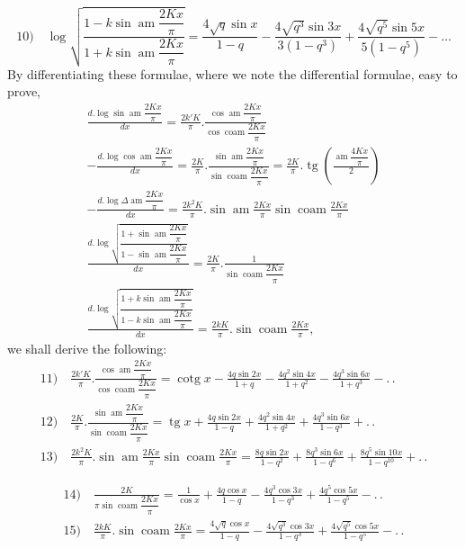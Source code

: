 \documentclass{article}
\begin{document}
\[
\text{10)}\quad\log\sqrt{\frac{1-k\sin\operatorname{am}\dfrac{2Kx}{\pi}}{1+k\sin\operatorname{am}\dfrac{2Kx}{\pi}}}=\frac{4\sqrt{q}\sin x}{1-q}-\frac{4\sqrt{q^{3}}\sin3x}{3(1-q^{3})}+\frac{4\sqrt{q^{5}}\sin5x}{5(1-q^{5})}-\ldots
\]
By differentiating these formulae, where we note the differential formulae, easy to prove,
\[
\begin{gathered}
\frac{d.\log\sin\operatorname{am}\dfrac{2Kx}{\pi}}{dx}=\frac{2k'K}{\pi}.\frac{\cos\operatorname{am}\dfrac{2Kx}{\pi}}{\cos\operatorname{coam}\dfrac{2Kx}{\pi}}\\[2ex]
-\frac{d.\log\cos\operatorname{am}\dfrac{2Kx}{\pi}}{dx}=\frac{2K}{\pi}.\frac{\sin\operatorname{am}\dfrac{2Kx}{\pi}}{\sin\operatorname{coam}\dfrac{2Kx}{\pi}}=\frac{2K}{\pi}.\operatorname{tg}\left(\frac{\operatorname{am}\dfrac{4Kx}{\pi}}{2}\right)\\[2ex]
-\frac{d.\log\Delta\operatorname{am}\dfrac{2Kx}{\pi}}{dx}=\frac{2k^{2}K}{\pi}.\sin\operatorname{am}\frac{2Kx}{\pi}\sin\operatorname{coam}\frac{2Kx}{\pi}\\[2ex]
\frac{d.\log\sqrt{\dfrac{1+\sin\operatorname{am}\dfrac{2Kx}{\pi}}{1-\sin\operatorname{am}\dfrac{2Kx}{\pi}}}}{dx}=\frac{2K}{\pi}.\frac{1}{\sin\operatorname{coam}\dfrac{2Kx}{\pi}}\\[2ex]
\frac{d.\log\sqrt{\dfrac{1+k\sin\operatorname{am}\dfrac{2Kx}{\pi}}{1-k\sin\operatorname{am}\dfrac{2Kx}{\pi}}}}{dx}=\frac{2kK}{\pi}.\sin\operatorname{coam}\frac{2Kx}{\pi},
\end{gathered}
\]
we shall derive the following:
\[
\begin{gathered}
\text{11)}\quad\frac{2k'K}{\pi}.\frac{\cos\operatorname{am}\dfrac{2Kx}{\pi}}{\cos\operatorname{coam}\dfrac{2Kx}{\pi}}=\operatorname{cotg}x-\frac{4q\sin2x}{1+q}-\frac{4q^{2}\sin4x}{1+q^{2}}-\frac{4q^{3}\sin6x}{1+q^{3}}-.\,.\\[2ex]
\text{12)}\quad\frac{2K}{\pi}.\frac{\sin\operatorname{am}\dfrac{2Kx}{\pi}}{\sin\operatorname{coam}\dfrac{2Kx}{\pi}}=\operatorname{tg}x+\frac{4q\sin2x}{1-q}+\frac{4q^{2}\sin4x}{1+q^{2}}+\frac{4q^{3}\sin6x}{1-q^{3}}+.\,.\\[2ex]
\text{13)}\quad\frac{2k^{2}K}{\pi}.\sin\operatorname{am}\frac{2Kx}{\pi}\sin\operatorname{coam}\frac{2Kx}{\pi}=\frac{8q\sin2x}{1-q^{2}}+\frac{8q^{3}\sin6x}{1-q^{6}}+\frac{8q^{5}\sin10x}{1-q^{10}}+.\,.
\end{gathered}
\]

\[
\begin{gathered}
\text{14)}\quad\frac{2K}{\pi\sin\operatorname{coam}\dfrac{2Kx}{\pi}}=\frac{1}{\cos x}+\frac{4q\cos x}{1-q}-\frac{4q^{3}\cos3x}{1-q^{3}}+\frac{4q^{5}\cos5x}{1-q^{5}}-.\,.\\[2ex]
\text{15)}\quad\frac{2kK}{\pi}.\sin\operatorname{coam}\frac{2Kx}{\pi}=\frac{4\sqrt{q}\cos x}{1-q}-\frac{4\sqrt{q^{3}}\cos3x}{1-q^{3}}+\frac{4\sqrt{q^{5}}\cos5x}{1-q^{5}}-.\,.
\end{gathered}
\]
\end{document}
